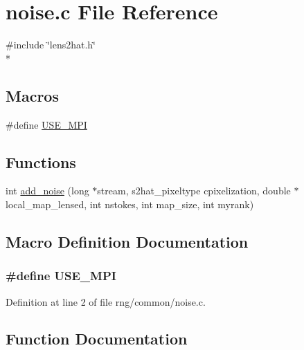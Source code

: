 \section{noise.\-c File Reference}
\label{rng_2common_2noise_8c}
{\ttfamily \#include \char`\"{}lens2hat.\-h\char`\"{}}\\*
\subsection*{Macros}
\begin{DoxyCompactItemize}
\item 
\#define \hyperlink{rng_2common_2noise_8c_a3869d282031f6ea6b50fdb980b758420}{U\-S\-E\-\_\-\-M\-P\-I}
\end{DoxyCompactItemize}
\subsection*{Functions}
\begin{DoxyCompactItemize}
\item 
int \hyperlink{rng_2common_2noise_8c_a86eb7aedb2f6d9347e44b50581e48208}{add\-\_\-noise} (long $\ast$stream, s2hat\-\_\-pixeltype cpixelization, double $\ast$local\-\_\-map\-\_\-lensed, int nstokes, int map\-\_\-size, int myrank)
\end{DoxyCompactItemize}


\subsection{Macro Definition Documentation}
\subsubsection[{U\-S\-E\-\_\-\-M\-P\-I}]{\setlength{\rightskip}{0pt plus 5cm}\#define U\-S\-E\-\_\-\-M\-P\-I}\label{rng_2common_2noise_8c_a3869d282031f6ea6b50fdb980b758420}


Definition at line 2 of file rng/common/noise.\-c.



\subsection{Function Documentation}
